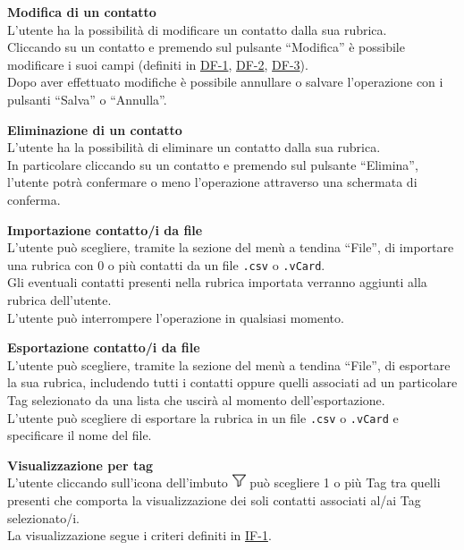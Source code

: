 \begin{tcolorbox}[breakable, colback=white,colframe=black!80!white,title=\textbf{Funzionalità individuali IF}]
\begin{itemize}[itemsep=2pt, topsep=0pt]
		\item[\textbf{IF-5}] \textbf{Modifica di un contatto}
		\\L’utente ha la possibilità di modificare un contatto dalla sua rubrica.
		\\Cliccando su un contatto e premendo sul pulsante “Modifica” è possibile modificare i suoi campi (definiti in \hyperlink{DF-1}{DF-1}, \hyperlink{DF-2}{DF-2}, \hyperlink{DF-3}{DF-3}). 
		\\Dopo aver effettuato modifiche è possibile annullare o salvare l’operazione con i pulsanti “Salva” o “Annulla”.
		
		\item[\textbf{IF-6}] \textbf{Eliminazione di un contatto}
		\\L’utente ha la possibilità di eliminare un contatto dalla sua rubrica. 
		\\In particolare cliccando su un contatto e premendo sul pulsante “Elimina”, l’utente potrà confermare o meno l’operazione attraverso una schermata di conferma.
		
		\item[\textbf{IF-7}] \textbf{Importazione contatto/i da file}
		\\L’utente può scegliere, tramite la sezione del menù a tendina “File”, di importare una rubrica con 0 o più contatti da un file \texttt{.csv} o \texttt{.vCard}. 
		\\Gli eventuali contatti presenti nella rubrica importata verranno aggiunti alla rubrica dell’utente. 
		\\L’utente può interrompere l’operazione in qualsiasi momento.
	
		\item[\textbf{IF-8}] \textbf{Esportazione contatto/i da file}
		\\L’utente può scegliere, tramite la sezione del menù a tendina “File”, di esportare la sua rubrica, includendo tutti i contatti oppure quelli associati ad un particolare Tag selezionato da una lista che uscirà al momento dell’esportazione.
		\\L’utente può scegliere di esportare la rubrica in un file \texttt{.csv} o \texttt{.vCard} e specificare il nome del file. 
		
		\hypertarget{IF-9}{\item[\textbf{IF-9}]} \textbf{Visualizzazione per tag}
		\\L’utente cliccando sull’icona dell’imbuto \includegraphics[height=0.4cm]{images/imbuto_icona.jpeg} può scegliere 1 o più Tag tra quelli presenti che comporta la visualizzazione dei soli contatti associati al/ai Tag selezionato/i.
		\\La visualizzazione segue i criteri definiti in \hyperlink{IF-1}{IF-1}.		
	\end{itemize}
\end{tcolorbox}

